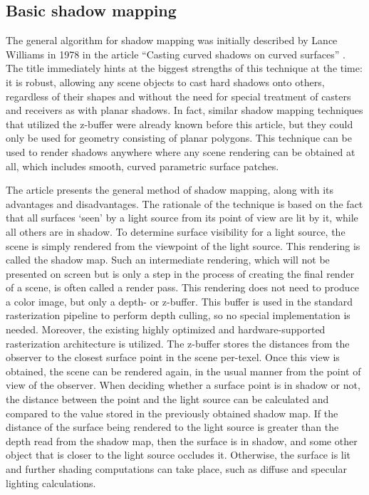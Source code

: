 \subsection{Basic shadow mapping}
\label{section:basic_mapping}
The general algorithm for shadow mapping was initially described by Lance Williams in 1978 in the article ``Casting curved shadows on curved surfaces'' \cite{bib:article:wiliams_curved_shadows}. The title immediately hints at the biggest strengths of this technique at the time: it is robust, allowing any scene objects to cast hard shadows onto others, regardless of their shapes and without the need for special treatment of casters and receivers as with planar shadows. In fact, similar shadow mapping techniques that utilized the z-buffer were already known before this article, but they could only be used for geometry consisting of planar polygons. This technique can be used to render shadows anywhere where any scene rendering can be obtained at all, which includes smooth, curved parametric surface patches.

The article presents the general method of shadow mapping, along with its advantages and disadvantages. The rationale of the technique is based on the fact that all surfaces `seen' by a light source from its point of view are lit by it, while all others are in shadow. To determine surface visibility for a light source, the scene is simply rendered from the viewpoint of the light source. This rendering is called the shadow map. Such an intermediate rendering, which will not be presented on screen but is only a step in the process of creating the final render of a scene, is often called a render pass. This rendering does not need to produce a color image, but only a depth- or z-buffer. This buffer is used in the standard rasterization pipeline to perform depth culling, so no special implementation is needed. Moreover, the existing highly optimized and hardware-supported rasterization architecture is utilized. The z-buffer stores the distances from the observer to the closest surface point in the scene per-texel. Once this view is obtained, the scene can be rendered again, in the usual manner from the point of view of the observer. When deciding whether a surface point is in shadow or not, the distance between the point and the light source can be calculated and compared to the value stored in the previously obtained shadow map. If the distance of the surface being rendered to the light source is greater than the depth read from the shadow map, then the surface is in shadow, and some other object that is closer to the light source occludes it. Otherwise, the surface is lit and further shading computations can take place, such as diffuse and specular lighting calculations.

